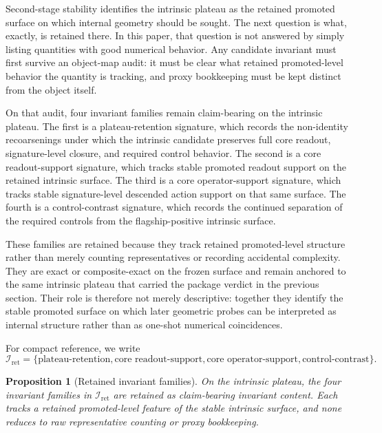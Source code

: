 \documentclass[11pt]{article}
\newtheorem{proposition}[theorem]{Proposition}
\theoremstyle{definition}
\begin{document}
Second-stage stability identifies the intrinsic plateau as the retained promoted surface on which internal geometry should be sought. The next question is what, exactly, is retained there. In this paper, that question is not answered by simply listing quantities with good numerical behavior. Any candidate invariant must first survive an object-map audit: it must be clear what retained promoted-level behavior the quantity is tracking, and proxy bookkeeping must be kept distinct from the object itself.

On that audit, four invariant families remain claim-bearing on the intrinsic plateau. The first is a plateau-retention signature, which records the non-identity recoarsenings under which the intrinsic candidate preserves full core readout, signature-level closure, and required control behavior. The second is a core readout-support signature, which tracks stable promoted readout support on the retained intrinsic surface. The third is a core operator-support signature, which tracks stable signature-level descended action support on that same surface. The fourth is a control-contrast signature, which records the continued separation of the required controls from the flagship-positive intrinsic surface.

These families are retained because they track retained promoted-level structure rather than merely counting representatives or recording accidental complexity. They are exact or composite-exact on the frozen surface and remain anchored to the same intrinsic plateau that carried the package verdict in the previous section. Their role is therefore not merely descriptive: together they identify the stable promoted surface on which later geometric probes can be interpreted as internal structure rather than as one-shot numerical coincidences.

For compact reference, we write
\[
\mathcal I_{\mathrm{ret}}
  =
  \{
    \text{plateau-retention},
    \text{core readout-support},
    \text{core operator-support},
    \text{control-contrast}
  \}.
\]

\begin{proposition}[Retained invariant families]
\label{prop:retained-invariants}
On the intrinsic plateau, the four invariant families in $\mathcal I_{\mathrm{ret}}$ are retained as claim-bearing invariant content. Each tracks a retained promoted-level feature of the stable intrinsic surface, and none reduces to raw representative counting or proxy bookkeeping.
\end{proposition}
\end{document}

